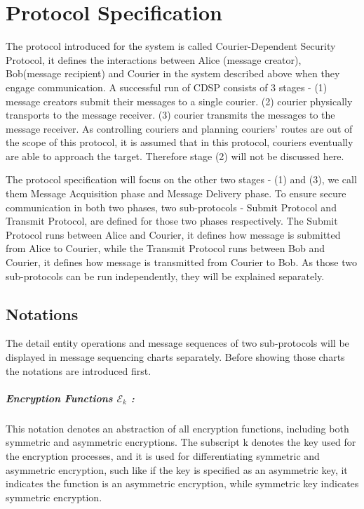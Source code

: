 \chapter{Protocol Specification}
The protocol introduced for the system is called Courier-Dependent Security Protocol, it defines the interactions between Alice (message creator), Bob(message recipient) and Courier in the system described above when they engage communication. A successful run of CDSP consists of 3 stages - (1) message creators submit their messages to a single courier. (2) courier physically transports to the message receiver. (3) courier transmits the messages to the message receiver. As controlling couriers and  planning couriers' routes are out of the scope of this protocol, it is assumed that in this protocol, couriers eventually are able to approach the target. Therefore stage (2) will not be discussed here.

The protocol specification will focus on the other two stages - (1) and (3), we call them Message Acquisition phase and Message Delivery phase. To ensure secure communication in both two phases, two sub-protocols - Submit Protocol and Transmit Protocol, are defined for those two phases respectively. The Submit Protocol runs between Alice and Courier, it defines how message is submitted from Alice to Courier, while the Transmit Protocol runs between Bob and Courier, it defines how message is transmitted from Courier to Bob. As those two sub-protocols can be run independently, they will be explained separately.

\section{Notations}
The detail entity operations and message sequences of two sub-protocols will be displayed in message sequencing charts separately. Before showing those charts the notations are introduced first.
\paragraph{Encryption Functions $\mathcal{E}_k$ :}
This notation denotes an abstraction of all encryption functions, including both symmetric and asymmetric encryptions. The subscript k denotes the key used for the encryption processes, and it is used for differentiating symmetric and asymmetric encryption, such like if the key is specified as an asymmetric key, it indicates the function is an asymmetric encryption, while symmetric key indicates symmetric encryption.
